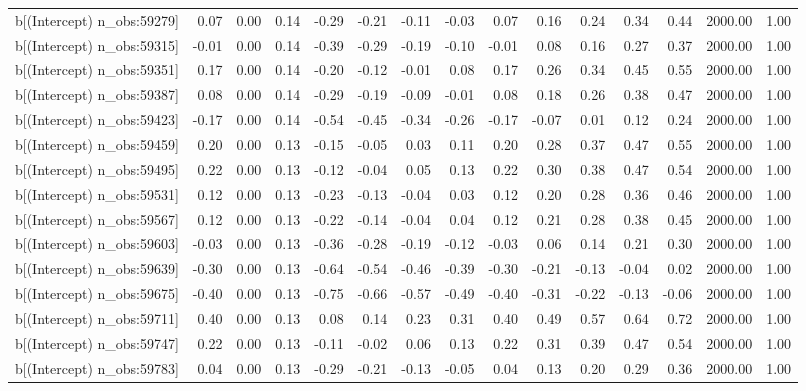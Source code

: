 \begin{table}[ht]
\begin{tabular}{rrrrrrrrrrrrrrr}
  b[(Intercept) n\_obs:59279] & 0.07 & 0.00 & 0.14 & -0.29 & -0.21 & -0.11 & -0.03 & 0.07 & 0.16 & 0.24 & 0.34 & 0.44 & 2000.00 & 1.00 \\ 
  b[(Intercept) n\_obs:59315] & -0.01 & 0.00 & 0.14 & -0.39 & -0.29 & -0.19 & -0.10 & -0.01 & 0.08 & 0.16 & 0.27 & 0.37 & 2000.00 & 1.00 \\ 
  b[(Intercept) n\_obs:59351] & 0.17 & 0.00 & 0.14 & -0.20 & -0.12 & -0.01 & 0.08 & 0.17 & 0.26 & 0.34 & 0.45 & 0.55 & 2000.00 & 1.00 \\ 
  b[(Intercept) n\_obs:59387] & 0.08 & 0.00 & 0.14 & -0.29 & -0.19 & -0.09 & -0.01 & 0.08 & 0.18 & 0.26 & 0.38 & 0.47 & 2000.00 & 1.00 \\ 
  b[(Intercept) n\_obs:59423] & -0.17 & 0.00 & 0.14 & -0.54 & -0.45 & -0.34 & -0.26 & -0.17 & -0.07 & 0.01 & 0.12 & 0.24 & 2000.00 & 1.00 \\ 
  b[(Intercept) n\_obs:59459] & 0.20 & 0.00 & 0.13 & -0.15 & -0.05 & 0.03 & 0.11 & 0.20 & 0.28 & 0.37 & 0.47 & 0.55 & 2000.00 & 1.00 \\ 
  b[(Intercept) n\_obs:59495] & 0.22 & 0.00 & 0.13 & -0.12 & -0.04 & 0.05 & 0.13 & 0.22 & 0.30 & 0.38 & 0.47 & 0.54 & 2000.00 & 1.00 \\ 
  b[(Intercept) n\_obs:59531] & 0.12 & 0.00 & 0.13 & -0.23 & -0.13 & -0.04 & 0.03 & 0.12 & 0.20 & 0.28 & 0.36 & 0.46 & 2000.00 & 1.00 \\ 
  b[(Intercept) n\_obs:59567] & 0.12 & 0.00 & 0.13 & -0.22 & -0.14 & -0.04 & 0.04 & 0.12 & 0.21 & 0.28 & 0.38 & 0.45 & 2000.00 & 1.00 \\ 
  b[(Intercept) n\_obs:59603] & -0.03 & 0.00 & 0.13 & -0.36 & -0.28 & -0.19 & -0.12 & -0.03 & 0.06 & 0.14 & 0.21 & 0.30 & 2000.00 & 1.00 \\ 
  b[(Intercept) n\_obs:59639] & -0.30 & 0.00 & 0.13 & -0.64 & -0.54 & -0.46 & -0.39 & -0.30 & -0.21 & -0.13 & -0.04 & 0.02 & 2000.00 & 1.00 \\ 
  b[(Intercept) n\_obs:59675] & -0.40 & 0.00 & 0.13 & -0.75 & -0.66 & -0.57 & -0.49 & -0.40 & -0.31 & -0.22 & -0.13 & -0.06 & 2000.00 & 1.00 \\ 
  b[(Intercept) n\_obs:59711] & 0.40 & 0.00 & 0.13 & 0.08 & 0.14 & 0.23 & 0.31 & 0.40 & 0.49 & 0.57 & 0.64 & 0.72 & 2000.00 & 1.00 \\ 
  b[(Intercept) n\_obs:59747] & 0.22 & 0.00 & 0.13 & -0.11 & -0.02 & 0.06 & 0.13 & 0.22 & 0.31 & 0.39 & 0.47 & 0.54 & 2000.00 & 1.00 \\ 
  b[(Intercept) n\_obs:59783] & 0.04 & 0.00 & 0.13 & -0.29 & -0.21 & -0.13 & -0.05 & 0.04 & 0.13 & 0.20 & 0.29 & 0.36 & 2000.00 & 1.00 \\ 

\end{tabular}
\end{table}
